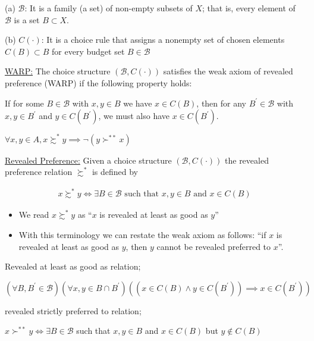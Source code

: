 \documentclass[12pt,a4paper,fleqn]{article}
\begin{document}
 (a) \(\mathcal{B}\): It is a family (a set) of non-empty subsets of \(X\); that is, every element of \(\mathcal{B}\) is a set \(B \subset X\).

 (b) \(C(\cdot)\): It is a choice rule that assigns a nonempty set of chosen elements \(C(B) \subset B\) for every budget set \(B \in \mathcal{B}\)

\underline{WARP:} The choice structure \((\mathcal{B}, C(\cdot))\) satisfies the weak axiom of revealed preference (WARP) if the following property holds:

If for some \(B \in \mathcal{B}\) with \(x, y \in B\) we have \(x \in C(B)\), then for any \(B^{\prime} \in \mathcal{B}\) with \(x, y \in B^{\prime}\) and \(y \in C\left(B^{\prime}\right)\), we must also have \(x \in C\left(B^{\prime}\right)\).

\(\forall x,y \in A, x \succsim^* y \implies \neg \left( y \succ^{**} x \right) \)  

\underline{Revealed Preference:} Given a choice structure \(\left( \mathcal{B},C(\cdot) \right) \) the revealed preference relation \(\succsim^*\) is defined by   
\begin{tcolorbox}
  \begin{align*}
    x \succsim^* y \Leftrightarrow \exists B \in \mathcal{B} \text { such that } x, y \in B \text { and } x \in C(B)
    \end{align*}
\end{tcolorbox}

\begin{itemize}
  \item We read \(x \succsim^* y\) as ``\(x\) is revealed at least as good as \(y\)''
  \item With this terminology we can restate the weak axiom as follows: ``if \(x\) is revealed at least as good as \(y\), then \(y\) cannot be revealed preferred to \(x\)''.
\end{itemize}           

Revealed at least as good as relation;

\(\left( \forall B, B^\prime \in \mathcal{B} \right) \left( \forall x,y \in B \cap B^\prime  \right)\left( \left(  x \in C(B) \wedge y \in C(B^\prime) \right)   \implies x \in C(B^\prime) \right)\)   

revealed strictly preferred to relation;

\(x \succ^{**} y  \Leftrightarrow \exists B \in \mathcal{B} \) such that \(x,y \in B\) and \(x\in C(B)\) but \(y \notin C(B)\)       
\end{document}
